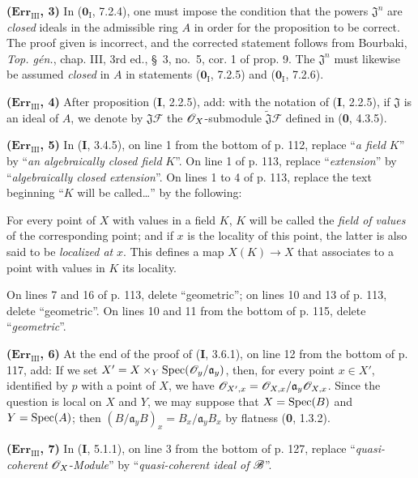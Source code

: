 \noindent\textbf{($\mathbf{Err}_{\mathrm{III}}$, 3)} In
($\mathbf{0}_{\mathrm I}$, 7.2.4), one must impose the condition that the powers
$\mathfrak J^n$ are \emph{closed} ideals in the admissible ring $A$ in order
for the proposition to be correct. The proof given is incorrect, and the
corrected statement follows from Bourbaki, \emph{Top. gén.}, chap. III, 3rd
ed., \S~3, no.~5, cor. 1 of prop. 9. The $\mathfrak J^n$ must likewise be
assumed \emph{closed} in $A$ in statements ($\mathbf{0}_{\mathrm I}$, 7.2.5) and
($\mathbf{0}_{\mathrm I}$, 7.2.6).

\noindent\textbf{($\mathbf{Err}_{\mathrm{III}}$, 4)} After proposition (\textbf{I},
2.2.5), add: with the notation of (\textbf{I}, 2.2.5), if $\mathfrak J$ is an ideal of
$A$, we denote by $\mathfrak J\mathscr F$ the
$\mathscr{O}_X$-submodule $\widetilde{\mathfrak J}\mathscr F$ defined in
(\textbf{0}, 4.3.5).

\noindent\textbf{($\mathbf{Err}_{\mathrm{III}}$, 5)} In (\textbf{I}, 3.4.5), on line
1 from the bottom of p. 112, replace ``\emph{a field} $K$'' by ``\emph{an
algebraically closed field} $K$''. On line 1 of p. 113, replace
``\emph{extension}'' by ``\emph{algebraically closed extension}''. On lines 1
to 4 of p. 113, replace the text beginning ``$K$ will be called\ldots{}'' by
the following:

For every point of $X$ with values in a field $K$, $K$ will be called the
\emph{field of values} of the corresponding point; and if $x$ is the locality
of this point, the latter is also said to be \emph{localized at} $x$. This
defines a map $X(K)\to X$ that associates to a point with values in $K$ its
locality.

On lines 7 and 16 of p. 113, delete ``geometric''; on lines 10 and 13 of p.
113, delete ``geometric''. On lines 10 and 11 from the bottom of p. 115,
delete ``\emph{geometric}''.

\noindent\textbf{($\mathbf{Err}_{\mathrm{III}}$, 6)} At the end of the proof
of (\textbf{I}, 3.6.1), on line 12 from the bottom of p. 117, add: If we set
$X'=X\times_Y\operatorname{Spec}(\mathscr{O}_y/\mathfrak a_y)$, then, for every point $x\in X'$,
identified by $p$ with a point of $X$, we have
$\mathscr{O}_{X',x}=\mathscr{O}_{X,x}/\mathfrak a_y\mathscr{O}_{X,x}$. Since the question is
local on $X$ and $Y$, we may suppose that $X=\operatorname{Spec}(B)$ and $Y=\operatorname{Spec}(A)$; then
$(B/\mathfrak a_yB)_x=B_x/\mathfrak a_yB_x$ by flatness (\textbf{0}, 1.3.2).

\noindent\textbf{($\mathbf{Err}_{\mathrm{III}}$, 7)} In (\textbf{I}, 5.1.1), on line
3 from the bottom of p. 127, replace ``\emph{quasi-coherent} $\mathscr{O}_X$-\emph{Module}'' by
``\emph{quasi-coherent ideal of} $\mathscr{B}$''.

